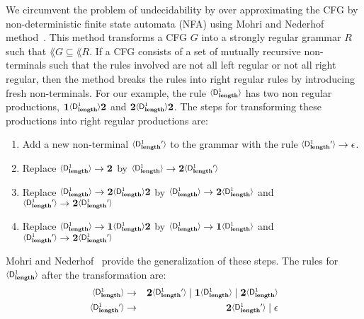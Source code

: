 We circumvent the problem of  undecidability by over approximating the
CFG by non-deterministic finite state automata (NFA) using
Mohri   and   Nederhof method~\cite{mohri00regular}.   This   method
transforms a CFG $G$ into a strongly  regular grammar $R$ such that $\lang{G} \subseteq \lang{R}$. 
If a CFG consists of a set of mutually recursive non-terminals such that the rules involved are not all left regular or not all right regular, then the method breaks the rules into right regular rules by introducing fresh non-terminals. For our example, the rule  $\var{\Df{\length}{1}}$ has two non regular productions,           $\acdr\var{\Df{\length}{1}}\clazy$          and
$\clazy\var{\Df{\length}{1}}{\clazy}$.  The steps for transforming these productions into
right regular productions are:

\begin{enumerate}
\item
Add a  new non-terminal  $\varnew{\Df{\length}{1}}$ to the  grammar with
the rule $\varnew{\Df{\length}{1}} \rightarrow \epsilon$.
\item
 Replace     $\var{\Df{\length}{1}}     \rightarrow     \clazy$     by
 $\var{\Df{\length}{1}} \rightarrow \clazy\varnew{\Df{\length}{1}}$
\item
 Replace
 $\var{\Df{\length}{1}} \rightarrow \clazy\var{\Df{\length}{1}}\clazy$
 by  $\var{\Df{\length}{1}}  \rightarrow  \clazy\var{\Df{\length}{1}}$
 and \linebreak $\varnew{\Df{\length}{1}} \rightarrow \clazy\varnew{\Df{\length}{1}}$
\item
  Replace
 $\var{\Df{\length}{1}} \rightarrow \acdr\var{\Df{\length}{1}}\clazy$
 by $\var{\Df{\length}{1}} \rightarrow \acdr\var{\Df{\length}{1}}$ and
 \linebreak $\varnew{\Df{\length}{1}} \rightarrow \clazy\varnew{\Df{\length}{1}}$
\end{enumerate}

Mohri and Nederhof~\cite{mohri00regular} provide the generalization of
these  steps.  The  rules for  
$\var{\Df{\length}{1}}$ after the transformation are:
\begin{eqnarray*}              
  \var{\Df{\length}{1}}   &\rightarrow&   \clazy\varnew{\Df{\length}{1}}
  \mid                 \acdr\var{\Df{\length}{1}}                 \mid
  \clazy\var{\Df{\length}{1}}\\  \varnew{\Df{\length}{1}}  &\rightarrow&
  \clazy\varnew{\Df{\length}{1}} \mid \epsilon
\end{eqnarray*}



